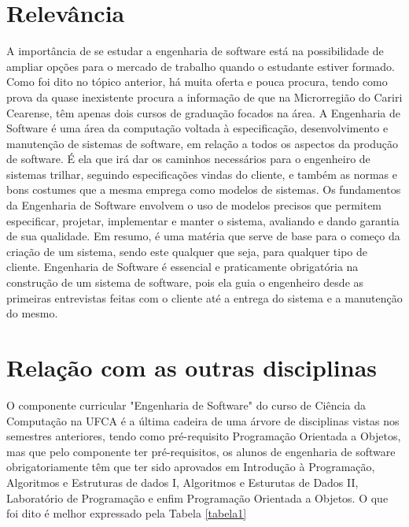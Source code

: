 \documentclass[10pt]{article}
\begin{document}
\section{Relevância}
    A importância de se estudar a engenharia de software está na possibilidade de ampliar opções para o
mercado de trabalho quando o estudante estiver formado. Como foi dito no tópico anterior, há muita oferta e pouca procura, tendo como prova da quase inexistente procura a informação de que na Microrregião do Cariri Cearense, têm apenas dois cursos de graduação focados na área. \cite{PPCcc1}
    A Engenharia de Software é uma área da computação voltada à especificação, desenvolvimento e manutenção
de sistemas de software, em relação a todos os aspectos da produção de software. É ela que irá dar os caminhos necessários para o engenheiro de sistemas trilhar, seguindo especificações vindas do cliente, e também as normas e bons costumes que a mesma emprega como modelos de sistemas. Os fundamentos da Engenharia de Software envolvem o uso de modelos precisos que permitem especificar, projetar, implementar e manter o sistema, avaliando e dando garantia de sua qualidade. Em resumo, é uma matéria que serve de base para o começo da criação de um sistema, sendo este qualquer que seja, para qualquer tipo de cliente. Engenharia de Software é essencial e praticamente obrigatória na construção de um sistema de software, pois ela guia o engenheiro desde as primeiras entrevistas feitas com o cliente até a entrega do sistema e a manutenção do mesmo. \cite{eng3}

\section{Relação com as outras disciplinas}
O componente curricular "Engenharia de Software" do curso de Ciência da Computação na UFCA é a última cadeira de uma árvore de disciplinas vistas nos semestres anteriores, tendo como pré-requisito Programação Orientada a Objetos, mas que pelo componente ter pré-requisitos, os alunos de engenharia de software obrigatoriamente têm que ter sido aprovados em Introdução à Programação, Algoritmos e Estruturas de dados I, Algoritmos e Esturutas de Dados II, Laboratório de Programação e enfim Programação Orientada a Objetos. \cite{PPCcc2} O que foi dito é melhor expressado pela Tabela \ref{tabela1}
\end{document}
